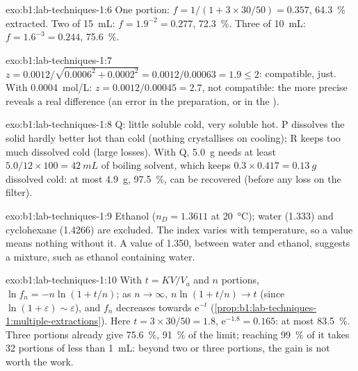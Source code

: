 \begin{solution}{exo:b1:lab-techniques-1:6}
One portion: $f = 1/(1 + 3 \times 30/50) = 0.357$, \qty{64.3}{\percent}
extracted. Two of \qty{15}{mL}: $f = 1.9^{-2} = 0.277$,
\qty{72.3}{\percent}. Three of \qty{10}{mL}: $f = 1.6^{-3} = 0.244$,
\qty{75.6}{\percent}.
\end{solution}

\begin{solution}{exo:b1:lab-techniques-1:7}
$z = 0.0012/\sqrt{0.0006^2 + 0.0002^2} = 0.0012/0.00063 = 1.9 \le 2$:
compatible, just. With \qty{0.0004}{mol/L}: $z = 0.0012/0.00045 = 2.7$,
not compatible: the more precise  reveals a real difference
(an error in the preparation, or in the ).
\end{solution}

\begin{solution}{exo:b1:lab-techniques-1:8}
Q: little soluble cold, very soluble hot. P dissolves the solid hardly
better hot than cold (nothing crystallises on cooling); R keeps too much
dissolved cold (large losses). With Q, \qty{5.0}{g} needs at least
$5.0/12 \times 100 = \qty{42}{mL}$ of boiling solvent, which keeps
$0.3 \times 0.417 = \qty{0.13}{g}$ dissolved cold: at most
\qty{4.9}{g}, \qty{97.5}{\percent}, can be recovered (before any loss on
the filter).
\end{solution}

\begin{solution}{exo:b1:lab-techniques-1:9}
Ethanol ($n_D = 1.3611$ at \qty{20}{\celsius}); water (1.333) and
cyclohexane (1.4266) are excluded. The index varies with temperature,
so a value means nothing without it. A value of 1.350, between water and
ethanol, suggests a mixture, such as ethanol containing water.
\end{solution}

\begin{solution}{exo:b1:lab-techniques-1:10}
With $t = KV/V_a$ and $n$ portions, $\ln f_n = -n\ln(1 + t/n)$; as
$n \to \infty$, $n \ln(1 + t/n) \to t$ (since $\ln(1 + \varepsilon) \sim
\varepsilon$), and $f_n$ decreases towards $\mathrm{e}^{-t}$ (\cref{prop:b1:lab-techniques-1:multiple-extractions}).
Here $t = 3 \times 30/50 = 1.8$, $\mathrm{e}^{-1.8} = 0.165$: at most
\qty{83.5}{\percent}. Three portions already give \qty{75.6}{\percent},
\qty{91}{\percent} of the limit; reaching \qty{99}{\percent} of it takes 32
portions of less than \qty{1}{mL}: beyond two or three portions, the gain is
not worth the work.
\end{solution}

